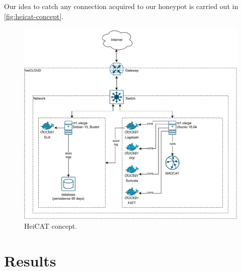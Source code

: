 Our idea to catch any connection acquired to our honeypot is carried out in \autoref{fig:heicat-concept}.

\begin{figure}[ht]
    \centering
    \includegraphics[width=\textwidth]{figures/heicat-conecpt.pdf}
    \caption[HeiCAT concept]{HeiCAT concept.}
    \label{fig:heicat-concept}
\end{figure}

\section{Results}
